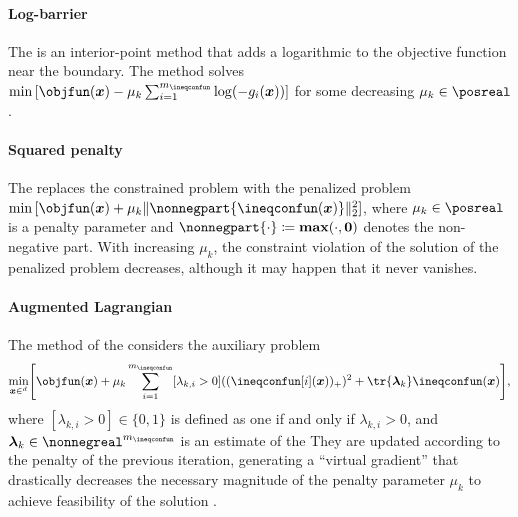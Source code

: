 \paragraph{Log-barrier}

The 
is an interior-point method that adds
a logarithmic  to the objective function
near the boundary.
The method solves
$\min\, [\objfun(\*x) - \mu_k \sum_{i=1}^{m_{\ineqconfun}} \log(-g_i(\*x))]$
for some decreasing $\mu_k \in \posreal$.

\paragraph{Squared penalty}

The 
replaces the constrained problem with the penalized problem
$\min\, [\objfun(\*x) + \mu_k \norm[2]{\nonnegpart{\ineqconfun(\*x)}}^2]$,
where $\mu_k \in \posreal$ is a penalty parameter and
$\nonnegpart{\cdot} \ceq \vecmax(\cdot, \*0)$ denotes the non-negative part.
With increasing $\mu_k$, the constraint violation of the solution of
the penalized problem decreases, although it may happen
that it never vanishes.

\paragraph{Augmented Lagrangian}

The method of the 
considers the auxiliary problem
\begin{equation}
  \min_{\*x \in \real^d} \bracket*{
    \objfun(\*x) + \mu_k \sum_{i=1}^{m_{\ineqconfun}} [\lambda_{k,i} > 0]
    ((\ineqconfun[i](\*x))_{+})^2 + \tr{\*\lambda_k} \ineqconfun(\*x)
  },
\end{equation}
where $[\lambda_{k,i} > 0] \in \{0, 1\}$ is defined as one
if and only if $\lambda_{k,i} > 0$, and
$\*\lambda_k \in \nonnegreal^{m_{\ineqconfun}}$ is an estimate of the
They are updated according to the penalty of the previous iteration,
generating a ``virtual gradient'' that drastically decreases
the necessary magnitude of the penalty parameter $\mu_k$
to achieve feasibility of the solution \cite{Toussaint15Introduction}.

